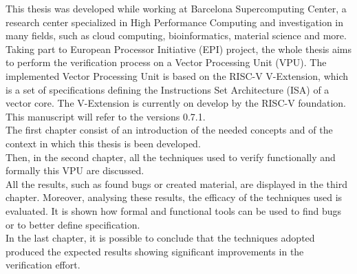 \summary
\english

This thesis was developed while working at Barcelona Supercomputing Center, a research center specialized in High Performance Computing and investigation in many fields, such as cloud computing, bioinformatics, material science and more.\\


Taking part to European Processor Initiative (EPI) project, the whole thesis aims to perform the verification process on a Vector Processing Unit (VPU).
The implemented Vector Processing Unit is based on the RISC-V V-Extension, which is a set of specifications defining the Instructions Set Architecture (ISA) of a vector core. The V-Extension is currently on develop by the RISC-V foundation. This manuscript will refer to the versions 0.7.1.\\

The   first  chapter consist of an introduction of the needed concepts and of the context in which this thesis is been developed.\\

Then, in the second chapter, all the techniques used to verify functionally and formally this VPU are discussed.\\

All the results, such as found bugs or created material, are displayed in the third chapter. Moreover, analysing these results, the efficacy of the techniques used is evaluated. It is shown how formal and functional tools can be used to find bugs or to better define specification. \\

In the last chapter, it is possible to conclude that the techniques  adopted produced the expected results showing significant improvements in the verification effort.








\bigskip
